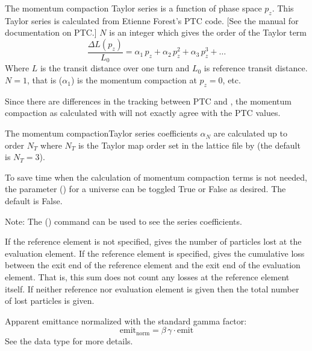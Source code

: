 \begin{description}
{The momentum compaction Taylor series is a function of phase space $p_z$. This Taylor series
is calculated from Etienne Forest's PTC code. [See the \bmad manual for documentation on PTC.] $N$ is
an integer which gives the order of the Taylor term
\begin{equation}
  \frac{\Delta L(p_z)}{L_0} = \alpha_1 \, p_z + \alpha_2 \, p_z^2 + \alpha_3 \, p_z^3 + \ldots
\end{equation}
Where $L$ is the transit distance over one turn and $L_0$ is reference transit distance.  $N = 1$,
that is  ($\alpha_1$) is the momentum compaction at $p_z = 0$, etc.

Since there are differences in the tracking between PTC and \bmad, the momentum compaction as calculated
with \bmad will not exactly agree with the PTC values.

The momentum compactionTaylor series coefficients $\alpha_N$ are calculated up to order $N_T$ where
$N_T$ is the Taylor map order set in the lattice file by  (the default
is $N_T=3$).

To save time when the calculation of momentum compaction terms is not needed, the  parameter
() for a universe can be toggled True or False as desired. The default is False.

Note: The  () command can be used to see the series coefficients.

  \item[n_particle_loss] \Newline {}
If the reference element is not specified,  gives the number of particles lost
at the evaluation element. If the reference element is specified,  gives the
cumulative loss between the exit end of the reference element and the exit end of the evaluation
element. That is, this sum does not count any losses at the reference element itself. If neither
reference nor evaluation element is given then the total number of lost particles is given.

  \item[norm_apparent_emit.x, .y] \Newline {}
Apparent emittance normalized with the standard gamma factor:
\begin{equation}
  \text{emit}_{\text{norm}} = \beta \, \gamma \cdot \text{emit}
\end{equation}
See the  data type for more details.

}
\end{description}
